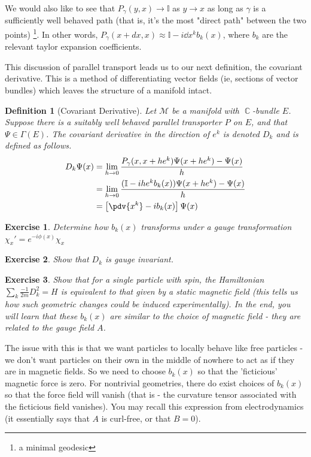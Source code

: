 \documentclass{article}
\newtheorem{exercise}{Exercise}[section]
\DeclareMathOperator{\CC}{\mathbb{C}}
\newtheorem{defn}{Definition}
\begin{document}
We would also like to see that $P_\gamma(y,x) \to \mathbb{I}$ as $y \to x$ as long as $\gamma$ is a sufficiently well behaved path (that is, it's the most "direct path" between the two points) \footnote{a minimal geodesic}. In other words, $P_\gamma(x+dx,x) \approx \mathbb{I} - i \dd x^k b_k(x)$, where $b_k$ are the relevant taylor expansion coefficients. 

This discussion of parallel transport leads us to our next definition, the covariant derivative. This is a method of differentiating vector fields (ie, sections of vector bundles) which leaves the structure of a manifold intact.

\begin{defn}[Covariant Derivative]
Let $\mathcal{M}$ be a manifold with $\CC$-bundle $E$. Suppose there is a suitably well behaved parallel transporter $P$ on $E$, and that $\Psi \in \Gamma(E)$. The covariant derivative in the direction of $e^k$ is denoted $D_k$ and is defined as follows.
\begin{align}
D_k \Psi(x) &= \lim_{h \to 0} \frac{P_\gamma (x,x+h e^k) \Psi(x+he^k) - \Psi(x)}{h}\\
	&= \lim_{h \to 0}\frac{(\mathbb{I} - i h e^k b_k(x))\Psi(x+ he^k) - \Psi(x)}{h}\\
	&= \left[\pdv{x^k}-ib_k(x)\right]\Psi(x)
\end{align} 
\end{defn}

\begin{exercise}
	Determine how $b_k(x)$ transforms under a gauge transformation $ \chi_x' = e^{-i\phi(x)}\chi_x $ 
\end{exercise}
\begin{exercise}
	Show that $D_k$ is gauge invariant.
\end{exercise}

\begin{exercise}
	Show that for a single particle with spin, the Hamiltonian $\sum_k \frac{-1}{2m} D_k^2 = H$ is equivalent to that given by a static magnetic field (this tells us how such geometric changes could be induced experimentally). In the end, you will learn that these $b_k(x)$ are similar to the choice of magnetic field - they are related to the gauge field $A$.
\end{exercise}

The issue with this is that we want particles to locally behave like free particles - we don't want particles on their own in the middle of nowhere to act as if they are in magnetic fields. So we need to choose $b_k(x)$ so that the 'ficticious' magnetic force is zero. For nontrivial geometries, there do exist choices of $b_k(x)$ so that the force field will vanish (that is - the curvature tensor associated with the ficticious field vanishes). You may recall this expression from electrodynamics (it essentially says that $A$ is curl-free, or that $B=0$).
\end{document}
